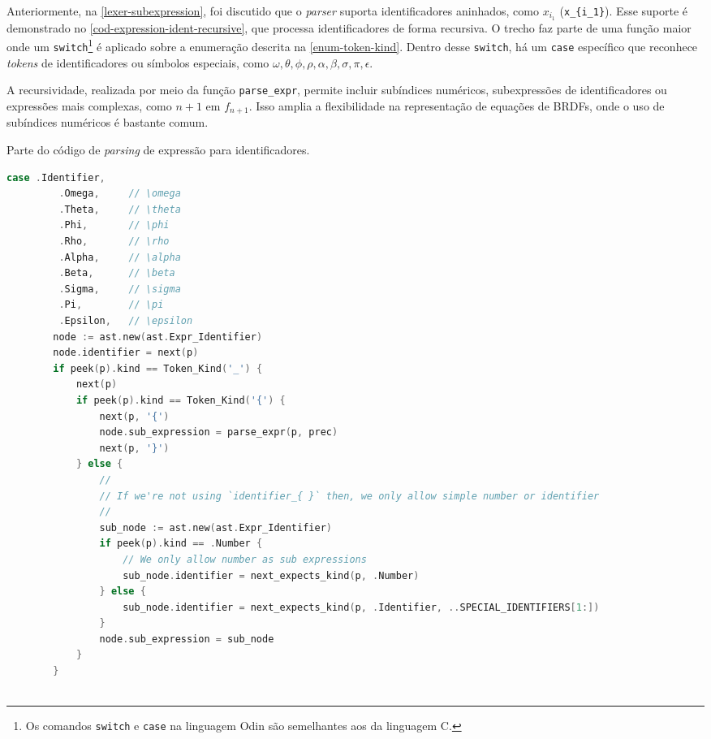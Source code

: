 Anteriormente, na \autoref{lexer-subexpression}, foi discutido que o \textit{parser} suporta identificadores aninhados, como \( x_{i_1} \) (\verb"x_{i_1}"). Esse suporte é demonstrado no \autoref{cod-expression-ident-recursive}, que processa identificadores de forma recursiva. O trecho faz parte de uma função maior onde um \texttt{switch}\footnote{Os comandos \texttt{switch} e \texttt{case} na linguagem Odin são semelhantes aos da linguagem C.} é aplicado sobre a enumeração descrita na \autoref{enum-token-kind}. Dentro desse \texttt{switch}, há um \texttt{case} específico que reconhece \textit{tokens} de identificadores ou símbolos especiais, como \( \omega, \theta, \phi, \rho, \alpha, \beta, \sigma, \pi, \epsilon \).

A recursividade, realizada por meio da função \texttt{parse\_expr}, permite incluir subíndices numéricos, subexpressões de identificadores ou expressões mais complexas, como \( n+1 \) em \( f_{n+1} \). Isso amplia a flexibilidade na representação de equações de BRDFs, onde o uso de subíndices numéricos é bastante comum.

\begin{codigo}[htb]
    \caption{\small Parte do código de \textit{parsing} de expressão para identificadores. }
        \label{cod-expression-ident-recursive}
  \begin{lstlisting}[language = C]
    case .Identifier,
         .Omega,     // \omega
         .Theta,     // \theta
         .Phi,       // \phi
         .Rho,       // \rho
         .Alpha,     // \alpha
         .Beta,      // \beta
         .Sigma,     // \sigma
         .Pi,        // \pi
         .Epsilon,   // \epsilon
        node := ast.new(ast.Expr_Identifier)
        node.identifier = next(p)
        if peek(p).kind == Token_Kind('_') {
            next(p)
            if peek(p).kind == Token_Kind('{') {
                next(p, '{')
                node.sub_expression = parse_expr(p, prec)
                next(p, '}')
            } else {
                //
                // If we're not using `identifier_{ }` then, we only allow simple number or identifier
                //
                sub_node := ast.new(ast.Expr_Identifier)
                if peek(p).kind == .Number {
                    // We only allow number as sub expressions
                    sub_node.identifier = next_expects_kind(p, .Number)
                } else {
                    sub_node.identifier = next_expects_kind(p, .Identifier, ..SPECIAL_IDENTIFIERS[1:])
                }
                node.sub_expression = sub_node
            }
        }
    
  \end{lstlisting}
\end{codigo}

